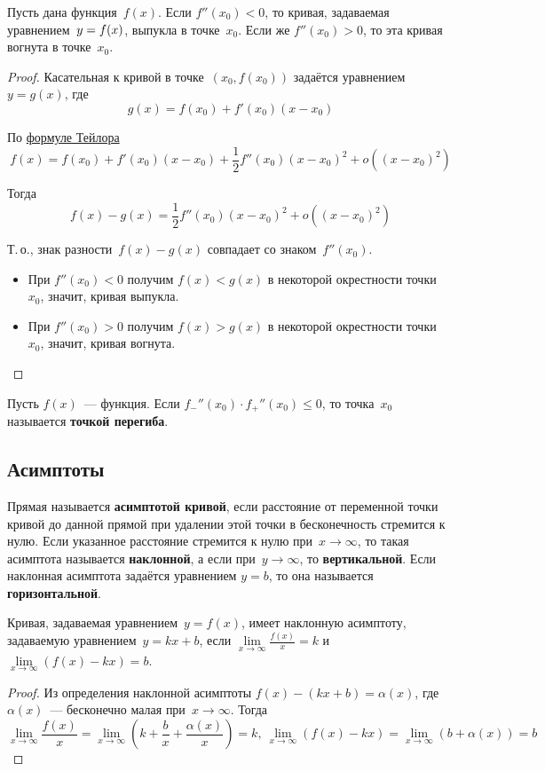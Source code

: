 \begin{theorem}
Пусть дана функция~$f(x)$.
Если $f''(x_0) < 0$, то кривая, задаваемая уравнением~$y \opbr= f(x)$, выпукла в точке~$x_0$.
Если же $f''(x_0) > 0$, то эта кривая вогнута в точке~$x_0$.
\end{theorem}
\begin{proof}
Касательная к кривой в точке~$(x_0, f(x_0))$ задаётся уравнением~$y = g(x)$, где
\begin{equation*}
g(x) = f(x_0) + f'(x_0)(x - x_0)
\end{equation*}

По \hyperref[eq:Taylor_series]{формуле Тейлора}
\begin{equation*}
f(x) = f(x_0) + f'(x_0)(x - x_0) + \frac12 f''(x_0)(x - x_0)^2 + o((x - x_0)^2)
\end{equation*}

Тогда
\begin{equation*}
f(x) - g(x) = \frac12 f''(x_0)(x - x_0)^2 + o((x - x_0)^2)
\end{equation*}

Т.\,о., знак разности~$f(x) - g(x)$ совпадает со знаком~$f''(x_0)$.
\begin{itemize}
	\item При $f''(x_0) < 0$ получим $f(x) < g(x)$ в некоторой окрестности точки~$x_0$, значит, кривая выпукла.
	\item При $f''(x_0) > 0$ получим $f(x) > g(x)$ в некоторой окрестности точки~$x_0$, значит, кривая вогнута.
\end{itemize}
\end{proof}

Пусть $f(x)$~--- функция.
 Если $f_-''(x_0) \cdot f_+''(x_0) \leqslant 0$, то точка~$x_0$ называется \textbf{точкой перегиба}.

\subsection{Асимптоты}
 Прямая называется \textbf{асимптотой кривой}, если расстояние от переменной точки кривой до данной прямой при удалении этой точки в бесконечность стремится к нулю.
Если указанное расстояние стремится к нулю при~$x \to \infty$, то такая асимптота называется \textbf{наклонной}, а если при~$y \to \infty$, то \textbf{вертикальной}.
Если наклонная асимптота задаётся уравнением $y = b$, то она называется \textbf{горизонтальной}.

\begin{theorem}
Кривая, задаваемая уравнением~$y = f(x)$, имеет наклонную асимптоту, задаваемую уравнением~$y = kx + b$, если $\lim\limits_{x \to \infty} \frac{f(x)}x = k$ и $\lim\limits_{x \to \infty} (f(x) - kx) = b$.
\end{theorem}
\begin{proof}
Из определения наклонной асимптоты $f(x) - (kx + b) = \alpha(x)$, где $\alpha(x)$~--- бесконечно малая при~$x \to \infty$.
Тогда
\begin{equation*}
\lim_{x \to \infty} \frac{f(x)}x =
\lim_{x \to \infty} \left( k + \frac{b}x + \frac{\alpha(x)}x \right) =
k, \
\lim_{x \to \infty} (f(x) - kx) =
\lim_{x \to \infty} (b + \alpha(x)) =
b
\end{equation*}
\end{proof}